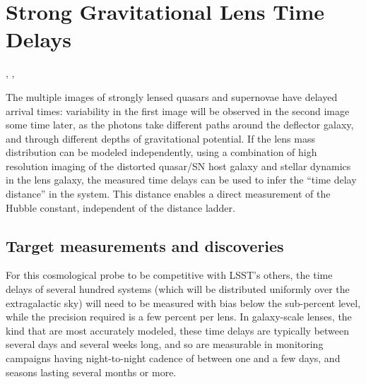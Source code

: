 %
%
%

\section{ Strong Gravitational Lens Time Delays }
\def\secname{lenstimedelays}\label{sec:\secname}

,
,

The multiple images of strongly lensed quasars and supernovae have
delayed arrival times: variability in the first image will be observed
in the second image some time later, as the photons take different
paths around the deflector galaxy, and through different depths of
gravitational potential. If the lens mass distribution can be modeled
independently, using a combination of high resolution imaging of the
distorted quasar/SN host galaxy and stellar dynamics in the lens
galaxy, the measured time delays can be used to infer the ``time delay
distance'' in the system. This distance enables a direct measurement
of the Hubble constant, independent of the distance ladder.


\subsection{Target measurements and discoveries}
\label{sec:\secname:targets}

For this cosmological probe to be competitive with LSST's others, the
time delays of several hundred systems (which will be distributed
uniformly over the extragalactic sky) will need to be measured with
bias below the sub-percent level, while the precision required is a
few percent per lens.  In galaxy-scale lenses, the kind that are most
accurately modeled, these time delays are typically between several
days and several weeks long, and so are measurable in monitoring
campaigns having night-to-night cadence of between one and a few days,
and seasons lasting several months or more.


